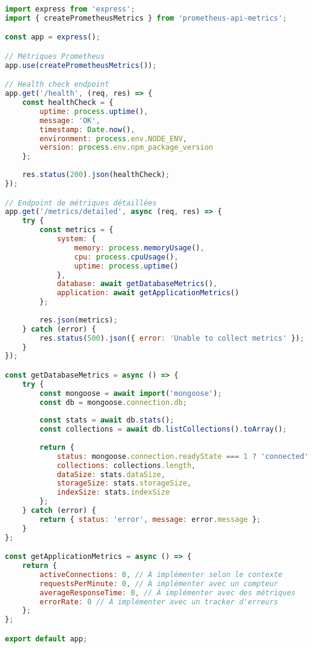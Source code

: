 \begin{lstlisting}[language=JavaScript, caption=monitoring.js]
import express from 'express';
import { createPrometheusMetrics } from 'prometheus-api-metrics';

const app = express();

// Métriques Prometheus
app.use(createPrometheusMetrics());

// Health check endpoint
app.get('/health', (req, res) => {
    const healthCheck = {
        uptime: process.uptime(),
        message: 'OK',
        timestamp: Date.now(),
        environment: process.env.NODE_ENV,
        version: process.env.npm_package_version
    };
    
    res.status(200).json(healthCheck);
});

// Endpoint de métriques détaillées
app.get('/metrics/detailed', async (req, res) => {
    try {
        const metrics = {
            system: {
                memory: process.memoryUsage(),
                cpu: process.cpuUsage(),
                uptime: process.uptime()
            },
            database: await getDatabaseMetrics(),
            application: await getApplicationMetrics()
        };
        
        res.json(metrics);
    } catch (error) {
        res.status(500).json({ error: 'Unable to collect metrics' });
    }
});

const getDatabaseMetrics = async () => {
    try {
        const mongoose = await import('mongoose');
        const db = mongoose.connection.db;
        
        const stats = await db.stats();
        const collections = await db.listCollections().toArray();
        
        return {
            status: mongoose.connection.readyState === 1 ? 'connected' : 'disconnected',
            collections: collections.length,
            dataSize: stats.dataSize,
            storageSize: stats.storageSize,
            indexSize: stats.indexSize
        };
    } catch (error) {
        return { status: 'error', message: error.message };
    }
};

const getApplicationMetrics = async () => {
    return {
        activeConnections: 0, // À implémenter selon le contexte
        requestsPerMinute: 0, // À implémenter avec un compteur
        averageResponseTime: 0, // À implémenter avec des métriques
        errorRate: 0 // À implémenter avec un tracker d'erreurs
    };
};

export default app;
\end{lstlisting}

